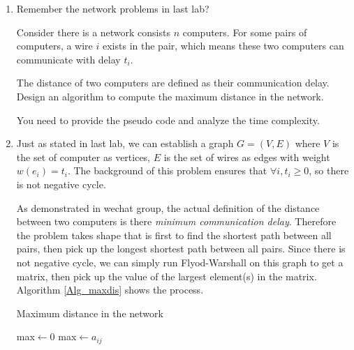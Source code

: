 \documentclass[12pt,a4paper]{article}
\makeatletter
\newtheorem*{solution}{Solution}
\theoremstyle{definition}
\renewenvironment{solution}[1][Solution] {\par\pushQED{\qed}\normalfont\topsep6\p@\@plus6\p@\relax\trivlist\item[\hskip\labelsep\bfseries#1\@addpunct{.}]\ignorespaces}{\popQED\endtrivlist\@endpefalse} \makeatother
\makeatother
\begin{document}
\begin{enumerate}
    
    \item
    Remember the network problems in last lab?\par
    Consider there is a network consists $n$ computers. For some pairs of computers, a wire $i$ exists in the pair, which means these two computers can communicate with delay $t_i$.\par
The distance of two computers are defined as their communication delay. Design an algorithm to compute the maximum distance in the network.\par
You need to provide the pseudo code and analyze the time complexity.\par
\begin{solution}
  Just as stated in last lab, we can establish a graph $G=(V,E)$ where $V$ is the set of computer as vertices, $E$ is the set of wires as edges with weight $w(e_i)=t_i$. The background of this problem ensures that $\forall i, t_i\geq0$, so there is not negative cycle. 
  
  As demonstrated in wechat group, the actual definition of the distance between two computers is there \emph{minimum communication delay}. Therefore the problem takes shape that is first to find the shortest path between all pairs, then pick up the longest shortest path between all pairs. Since there is not negative cycle, we can simply run Flyod-Warshall on this graph to get a matrix, then pick up the value of the largest element(s) in the matrix. Algorithm \ref{Alg_maxdis}  shows the process.\newline
  \begin{minipage}[t]{0.9\textwidth}
    \begin{algorithm}[H]
      \BlankLine
      \caption{Maximum distance in the network}\label{Alg_maxdis}
      \BlankLine
      max$\leftarrow 0$\;
      {
       {
         {max$\leftarrow a_{ij}$\;}
      }
    }
    \;
    \end{algorithm}
    \end{minipage}


\end{solution}
\end{enumerate}
\end{document}
